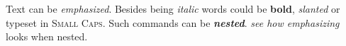 \documentclass {article}
\begin{document}
Text can be \emph{emphasized}.
Besides being \textit{italic} words could be \textbf{bold},
\textsl{slanted} or typeset in \textsc{Small Caps}.
Such commands can be \textit{\textbf{nested}}.
\emph{see how \emph{emphasizing}} looks when nested.
\end{document}
